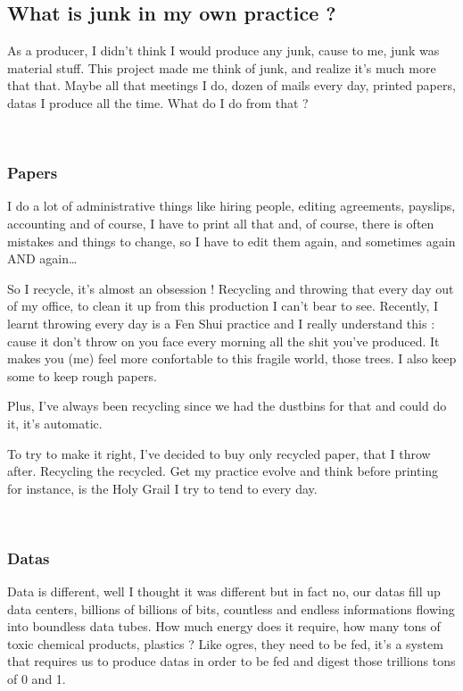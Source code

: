 \subsection[What is junk in my own practice ?]{What is junk in
my own practice ?}


As a producer, I didn{\textquoteright}t think I would produce any junk,
cause to me, junk was material stuff. This project made me think of
junk, and realize it{\textquoteright}s much more that that. Maybe all
that meetings I do, dozen of mails every day, printed papers, datas I
produce all the time. What do I do from that ?

~

\subsubsection[Papers]{Papers}
I do a lot of administrative things like hiring people, editing
agreements, payslips, accounting and of course, I have to print all
that and, of course, there is often mistakes and things to change, so I
have to edit them again, and sometimes again AND again{\dots}

So I recycle, it{\textquoteright}s almost an obsession ! Recycling and
throwing that every day out of my office, to clean it up from this
production I can{\textquoteright}t bear to see. Recently, I learnt
throwing every day is a Fen Shui practice and I really understand this
: cause it don{\textquoteright}t throw on you face every morning all
the shit you{\textquoteright}ve produced. It makes you (me) feel more
confortable to this fragile world, those trees. I also keep some to
keep rough papers.

Plus, I{\textquoteright}ve always been recycling since we had the
dustbins for that and could do it, it{\textquoteright}s automatic.

To try to make it right, I{\textquoteright}ve decided to buy only
recycled paper, that I throw after. Recycling the recycled. Get my
practice evolve and think before printing for instance, is the Holy
Grail I try to tend to every day.

~

\subsubsection[Datas]{Datas}
Data is different, well I thought it was different but in fact no, our
datas fill up data centers, billions of billions of bits, countless and
endless informations flowing into boundless data tubes. How much energy
does it require, how many tons of toxic chemical products, plastics ?
Like ogres, they need to be fed, it{\textquoteright}s a system that
requires us to produce datas in order to be fed and digest those
trillions tons of 0 and 1.

